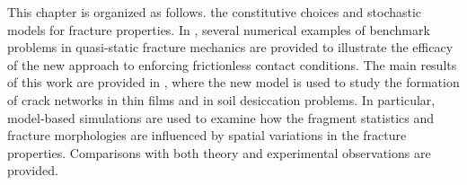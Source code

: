 This chapter is organized as follows.  the constitutive choices and stochastic models for fracture properties.  In , several numerical examples of benchmark problems in quasi-static fracture mechanics are provided to illustrate the efficacy of the new approach to enforcing frictionless contact conditions.  The main results of this work are provided in , where the new model is used to study the formation of crack networks in thin films and in soil desiccation problems.  In particular, model-based simulations are used to examine how the fragment statistics and fracture morphologies are influenced by spatial variations in the fracture properties.  Comparisons with both theory and experimental observations are provided.
